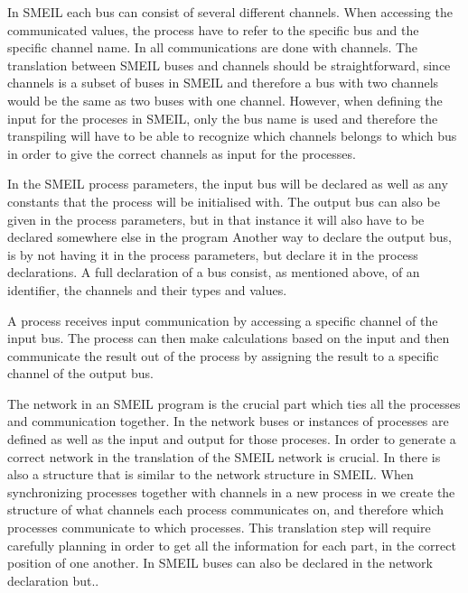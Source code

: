 In SMEIL each bus can consist of several different channels. When accessing the communicated values, the process have to refer to the specific bus and the specific channel name. In \cspm all communications are done with channels. The translation between SMEIL buses and \cspm channels should be straightforward, since channels is a subset of buses in SMEIL and therefore a bus with two channels would be the same as two buses with one channel. However, when defining the input for the proceses in SMEIL, only the bus name is used and therefore the transpiling will have to be able to recognize which channels belongs to which bus in order to give the correct channels as input for the \cspm processes.



In the SMEIL process parameters, the input bus will be declared as well as any constants that the process will be initialised with. The output bus can also be given in the process parameters, but in that instance it will also have to be declared somewhere else in the program
Another way to declare the output bus, is by not having it in the process parameters, but declare it in the process declarations.
A full declaration of a bus consist, as mentioned above, of an identifier, the channels and their types and values.

A process receives input communication by accessing a specific channel of the input bus. The process can then make calculations based on the input and then communicate the result out of the process by assigning the result to a specific channel of the output bus.





The network in an SMEIL program is the crucial part which ties all the processes and communication together. In the network buses or instances of processes are defined as well as the input and output for those proceses. In order to generate a correct network in \cspm the translation of the SMEIL network is crucial.
In \cspm there is also a structure that is similar to the network structure in SMEIL. When synchronizing processes together with channels in a new process in \cspm we create the structure of what channels each process communicates on, and therefore which processes communicate to which processes.
This translation step will require carefully planning in order to get all the information for each part, in the correct position of one another. In SMEIL buses can also be declared in the network declaration but.. %


